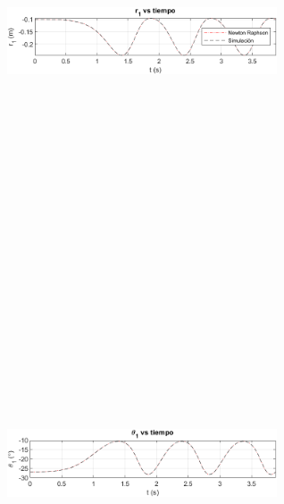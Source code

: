 \documentclass[12pt]{article}
\begin{document}
\begin{multicols}{2}
\begin{figure} [H]
        \centerline{\includegraphics[width=8cm, height=12cm,keepaspectratio]{Inventor vs NR/r1 vs inventor.png}}
    \end{figure}
    \vspace{-25pt}
        \begin{figure} [H]
        \centerline{\includegraphics[width=8cm, height=12cm,keepaspectratio]{Inventor vs NR/theta1 vs inventor.png}}

\end{figure}
\end{multicols}
\end{document}
